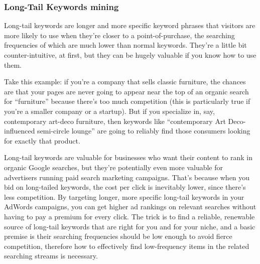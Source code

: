 \documentclass[conference]{IEEEtran}
\begin{document}
\subsubsection{Long-Tail Keywords mining}
Long-tail keywords are longer and more specific keyword phrases that visitors are more likely to use when they're closer to a point-of-purchase, the searching frequencies of which are much lower than normal keywords. They're a little bit counter-intuitive, at first, but they can be hugely valuable if you know how to use them.\par
Take this example: if you're a company that sells classic furniture, the chances are that your pages are never going to appear near the top of an organic search for ``furniture'' because there's too much competition (this is particularly true if you're a smaller company or a startup). But if you specialize in, say, contemporary art-deco furniture, then keywords like ``contemporary Art Deco-influenced semi-circle lounge'' are going to reliably find those consumers looking for exactly that product.\par
Long-tail keywords are valuable for businesses who want their content to rank in organic Google searches, but they're potentially even more valuable for advertisers running paid search marketing campaigns. That's because when you bid on long-tailed keywords, the cost per click is inevitably lower, since there's less competition. By targeting longer, more specific long-tail keywords in your AdWords campaigns, you can get higher ad rankings on relevant searches without having to pay a premium for every click. The trick is to find a reliable, renewable source of long-tail keywords that are right for you and for your niche, and a basic premise is their searching frequencies should be low enough to avoid fierce competition, therefore how to effectively find low-frequency items in the related searching streams is necessary.  
\end{document}
